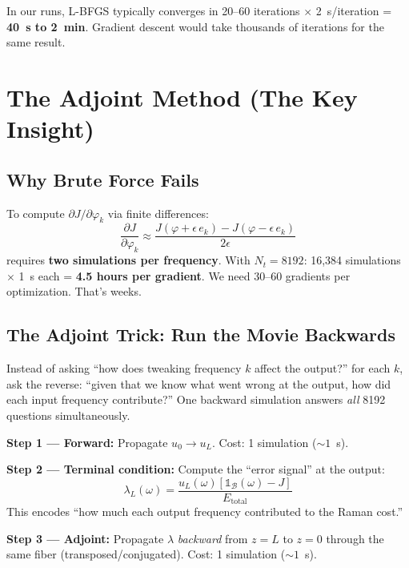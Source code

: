 \documentclass[12pt,a4paper]{article}
\newcommand{\pdv}[2]{\frac{\partial #1}{\partial #2}}
\begin{document}
In our runs, L-BFGS typically converges in 20--60 iterations $\times$ 2~s/iteration = \textbf{40~s to 2~min}. Gradient descent would take thousands of iterations for the same result.


\section{The Adjoint Method (The Key Insight)}

\subsection{Why Brute Force Fails}

To compute $\partial J/\partial\varphi_k$ via finite differences:
\begin{equation}
\pdv{J}{\varphi_k} \approx \frac{J(\varphi + \epsilon\,e_k) - J(\varphi - \epsilon\,e_k)}{2\epsilon}
\end{equation}
requires \textbf{two simulations per frequency}. With $N_t = 8192$: 16,384 simulations $\times$ 1~s each = \textbf{4.5 hours per gradient}. We need 30--60 gradients per optimization. That's weeks.

\subsection{The Adjoint Trick: Run the Movie Backwards}

\begin{intuition}
Instead of asking ``how does tweaking frequency $k$ affect the output?'' for each $k$, ask the reverse: ``given that we know what went wrong at the output, how did each input frequency contribute?'' One backward simulation answers \emph{all} 8192 questions simultaneously.
\end{intuition}

\textbf{Step 1 --- Forward:} Propagate $u_0 \to u_L$. Cost: 1 simulation (${\sim}1$~s).

\textbf{Step 2 --- Terminal condition:} Compute the ``error signal'' at the output:
\begin{equation}
\lambda_L(\omega) = \frac{u_L(\omega)\left[\mathbb{1}_\mathcal{B}(\omega) - J\right]}{E_{\text{total}}}
\label{eq:terminal}
\end{equation}
This encodes ``how much each output frequency contributed to the Raman cost.''

\textbf{Step 3 --- Adjoint:} Propagate $\lambda$ \emph{backward} from $z=L$ to $z=0$ through the same fiber (transposed/conjugated). Cost: 1 simulation (${\sim}1$~s).
\end{document}
